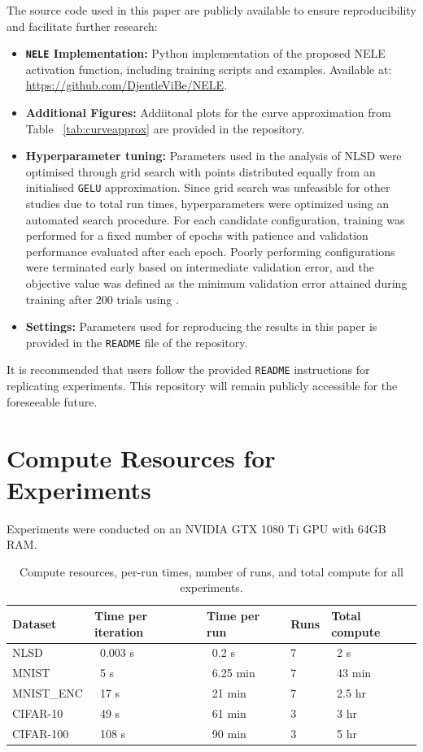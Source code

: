 \documentclass{article}
\begin{document}
The source code used in this paper are publicly available to ensure reproducibility and facilitate further research:

\begin{itemize}
    \item \textbf{\texttt{NELE} Implementation:} Python implementation of the proposed NELE activation function, including training scripts and examples. Available at: 
    \url{https://github.com/DjentleViBe/NELE}.
    
    \item \textbf{Additional Figures:} Addiitonal plots for the curve approximation from Table ~\ref{tab:curveapprox} are provided in the repository.
    \item \textbf{Hyperparameter tuning: }Parameters used in the analysis of NLSD were optimised through grid search with points 
    distributed equally from an initialised \texttt{GELU} approximation. Since grid search was unfeasible for other studies due to total run times, 
    hyperparameters were optimized using an automated search procedure. 
    For each candidate configuration, training was performed for a fixed number of 
    epochs with patience and validation performance evaluated after each epoch. Poorly performing 
    configurations were terminated early based on intermediate validation error, 
    and the objective value was defined as the minimum validation error attained during training after 200 trials using \cite{optuna_2019}.
    \item \textbf{Settings:} Parameters used for reproducing the results in this paper is provided in the
    \texttt{README} file of the repository.
  
\end{itemize}

It is recommended that users follow the provided \texttt{README} instructions for replicating experiments. This repository will remain publicly accessible for the foreseeable future.

\section{Compute Resources for Experiments}
\label{app:compute}
Experiments were conducted on an NVIDIA GTX 1080 Ti GPU 
with 64GB RAM.
\begin{table}[h]
\small
\centering
\begin{tabular}{l l l l l}
\textbf{Dataset} & \textbf{Time per iteration} & \textbf{Time per run} & \textbf{Runs} & \textbf{Total compute} \\
\hline
NLSD & ~0.003 s & ~0.2 s & 7 & ~2 s \\
MNIST & ~5 s & ~6.25 min & 7 & ~43 min \\
MNIST\_ENC & ~17 s & ~21 min & 7 & ~2.5 hr \\
CIFAR-10 & ~49 s & ~61 min & 3 & ~3 hr \\
CIFAR-100 & ~108 s & ~90 min & 3 & ~5 hr \\
\end{tabular}
\caption{Compute resources, per-run times, number of runs, and total compute for all experiments.}
\end{table}
\end{document}
